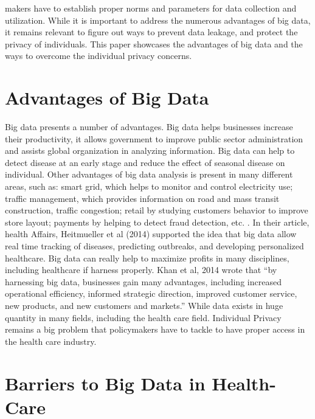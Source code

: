 \documentclass[sigconf]{acmart}
\begin{document}
makers have to establish proper norms and parameters for data collection and utilization. While it is important to address the numerous advantages of big data, it remains relevant to figure out ways to prevent data leakage, and protect the privacy of individuals.  This paper showcases the advantages of big data and the ways to overcome the individual privacy concerns.\cite{roski2014creating}    

\section{Advantages of Big Data}

Big data presents a number of advantages. Big data helps businesses increase their productivity, it allows government to improve public sector administration and assists global organization in analyzing information. Big data can help to detect disease at an early stage and reduce the effect of seasonal disease on individual. Other advantages of big data analysis is present in many different areas, such as:  smart grid, which helps to monitor and control electricity use; traffic management, which provides information on road and mass transit construction, traffic congestion; retail by studying customers behavior to improve store layout; payments by helping to detect fraud detection, etc. \cite{tene2012big}. In their article, health Affairs, Heitmueller et al (2014) supported the idea that big data allow real time tracking of diseases, predicting outbreaks, and developing personalized healthcare. Big data can really help to maximize profits in many disciplines, including healthcare if harness properly. Khan et al, 2014 wrote that “by harnessing big data, businesses gain many advantages, including increased operational efficiency, informed strategic direction, improved customer service, new products, and new customers and markets.” While data exists in huge quantity in many fields, including the health care field. Individual Privacy remains a big problem that policymakers have to tackle to have proper access in the health care industry.

\section{Barriers to Big Data in Health-Care}
\end{document}
